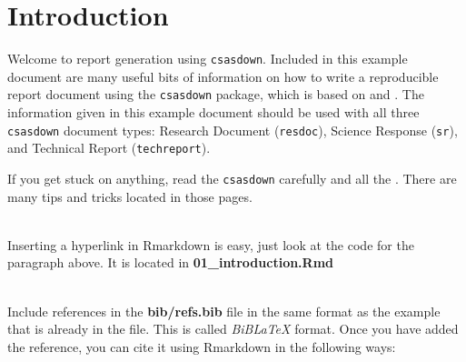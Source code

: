 \documentclass[12pt]{article}\usepackage[]{graphicx}\usepackage[]{color}
\begin{document}

\frontmatter


\renewcommand{\headrulewidth}{0.5pt}  %
\renewcommand{\footrulewidth}{0.5pt}  %

\newcommand{\lt}{\ensuremath <}
\newcommand{\gt}{\ensuremath >}

\newlength{\cslhangindent}
\setlength{\cslhangindent}{1.5em}
\newenvironment{cslreferences}%
  {}%
  {\par}

\hypertarget{sec:introduction}{%
\section{Introduction}\label{sec:introduction}}

Welcome to report generation using \texttt{csasdown}. Included in this example document are many useful bits of information on how to write a reproducible report document using the \texttt{csasdown} package, which is based on  and . The information given in this example document should be used with all three \texttt{csasdown} document types: Research Document (\texttt{resdoc}), Science Response (\texttt{sr}), and Technical Report (\texttt{techreport}).

If you get stuck on anything, read the \texttt{csasdown}  carefully and all the . There are many tips and tricks located in those pages.

~\\

Inserting a hyperlink in Rmarkdown is easy, just look at the code for the paragraph above. It is located in \textbf{01\_introduction.Rmd}

~\\

Include references in the \textbf{bib/refs.bib} file in the same format as the example that is already in the file. This is called \emph{BiBLaTeX} format. Once you have added the reference, you can cite it using Rmarkdown in the following ways:
\end{document}
